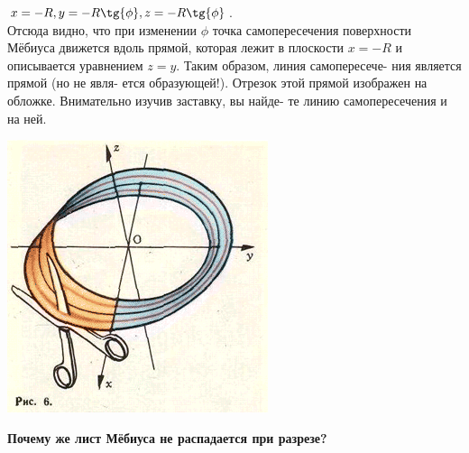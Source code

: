 \begin{multicols}{2}
\noindent
$x = -R, y = -R \tg{\phi}, z = -R \tg{\phi}$. \\

\noindent
Отсюда видно, что при изменении $\phi$ точка самопересечения поверхности Мёбиуса движется вдоль прямой, которая лежит в плоскости $x = -R$ и описывается уравнением $z = y$. Таким образом, линия самопересече- \linebreak
ния является прямой (но не явля- \linebreak
ется образующей!). Отрезок этой \linebreak 
прямой изображен на обложке. Внимательно изучив заставку, вы найде- \linebreak
те линию самопересечения и на ней.

\columnbreak

\begin{Figure}
    \centering
    \includegraphics[width=\columnwidth]{pic1.png}
\end{Figure}

\noindent
\small
\textbf{Почему же лист Мёбиуса не \linebreak
распадается при разрезе?}


\end{multicols}
